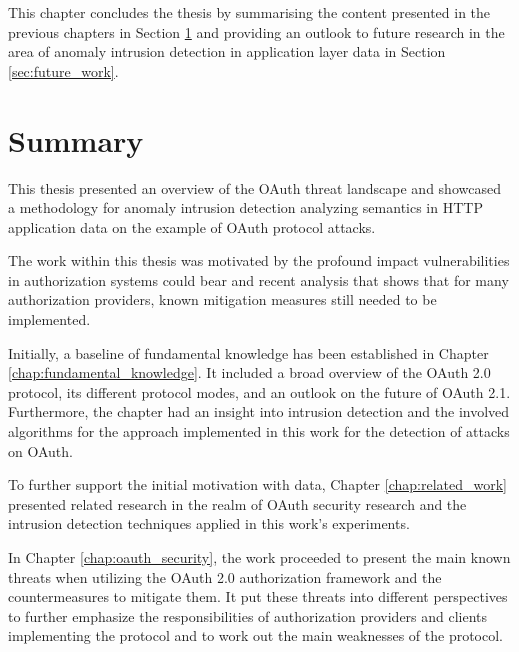 This chapter concludes the thesis by summarising the content presented in the previous chapters in Section \ref{sec:summary}  and providing an outlook to future research in the area of anomaly intrusion detection in application layer data in Section \ref{sec:future_work}.

\section{Summary}
\label{sec:summary}
This thesis presented an overview of the OAuth threat landscape and showcased a methodology for anomaly intrusion detection analyzing semantics in HTTP application data on the example of OAuth protocol attacks.

The work within this thesis was motivated by the profound impact vulnerabilities in authorization systems could bear and recent analysis that shows that for many authorization providers, known mitigation measures still needed to be implemented.

Initially, a baseline of fundamental knowledge has been established in Chapter \ref{chap:fundamental_knowledge}. It included a broad overview of the  OAuth 2.0 protocol, its different protocol modes, and an outlook on the future of OAuth 2.1. Furthermore, the chapter had an insight into intrusion detection and the involved algorithms for the approach implemented in this work for the detection of attacks on OAuth. 

To further support the initial motivation with data, Chapter
\ref{chap:related_work} presented related research in the realm of OAuth security research and the intrusion detection techniques applied in this work's experiments.

In Chapter \ref{chap:oauth_security}, the work proceeded to present the main known threats when utilizing the OAuth 2.0 authorization framework and the countermeasures to mitigate them. It put these threats into different perspectives to further emphasize the responsibilities of authorization providers and clients implementing the protocol and to work out the main weaknesses of the protocol.

